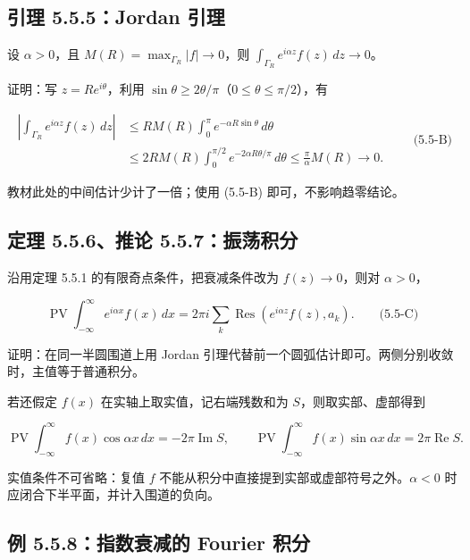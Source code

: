 \documentclass[11pt,a4paper]{article}
\begin{document}
\subsection{引理 5.5.5：Jordan 引理}\label{ch05-s5-heading-3}

设 \(\alpha>0\)，且 \(M(R)=\max_{\Gamma_R}|f|\to0\)，则
\(\int_{\Gamma_R}e^{i\alpha z}f(z)\,dz\to0\)。

证明：写 \(z=Re^{i\theta}\)，利用
\(\sin\theta\ge2\theta/\pi\)（\(0\le\theta\le\pi/2\)），有

\[
\begin{aligned}
\left|\int_{\Gamma_R}e^{i\alpha z}f(z)\,dz\right|
&\le RM(R)\int_0^\pi e^{-\alpha R\sin\theta}\,d\theta\\
&\le2RM(R)\int_0^{\pi/2}e^{-2\alpha R\theta/\pi}\,d\theta
\le\frac{\pi}{\alpha}M(R)\longrightarrow0.
\end{aligned}
\qquad\text{(5.5-B)}
\]

教材此处的中间估计少计了一倍；使用 (5.5-B) 即可，不影响趋零结论。

\subsection{定理 5.5.6、推论 5.5.7：振荡积分}\label{ch05-s5-heading-4}

沿用定理 5.5.1 的有限奇点条件，把衰减条件改为 \(f(z)\to0\)，则对
\(\alpha>0\)，

\[
\operatorname{PV}\int_{-\infty}^{\infty}e^{i\alpha x}f(x)\,dx
=2\pi i\sum_k\operatorname{Res}(e^{i\alpha z}f(z),a_k).
\qquad\text{(5.5-C)}
\]

证明：在同一半圆围道上用 Jordan
引理代替前一个圆弧估计即可。两侧分别收敛时，主值等于普通积分。

若还假定 \(f(x)\) 在实轴上取实值，记右端残数和为
\(S\)，则取实部、虚部得到

\[
\operatorname{PV}\int_{-\infty}^{\infty}f(x)\cos\alpha x\,dx
=-2\pi\operatorname{Im}S,\qquad
\operatorname{PV}\int_{-\infty}^{\infty}f(x)\sin\alpha x\,dx
=2\pi\operatorname{Re}S.
\]

实值条件不可省略：复值 \(f\)
不能从积分中直接提到实部或虚部符号之外。\(\alpha<0\)
时应闭合下半平面，并计入围道的负向。

\subsection{例 5.5.8：指数衰减的 Fourier 积分}\label{ch05-s5-heading-5}
\end{document}
